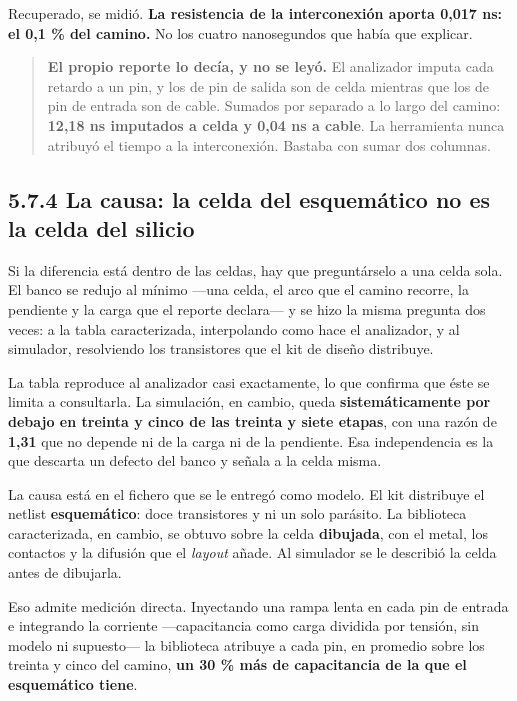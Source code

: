 Recuperado, se midió. \textbf{La resistencia de la interconexión aporta
0,017 ns: el 0,1 \% del camino.} No los cuatro nanosegundos que había
que explicar.

\begin{quote}
\textbf{El propio reporte lo decía, y no se leyó.} El analizador imputa
cada retardo a un pin, y los de pin de salida son de celda mientras que
los de pin de entrada son de cable. Sumados por separado a lo largo del
camino: \textbf{12,18 ns imputados a celda y 0,04 ns a cable}. La
herramienta nunca atribuyó el tiempo a la interconexión. Bastaba con
sumar dos columnas.
\end{quote}

\subsection{5.7.4 La causa: la celda del esquemático no es la celda del
silicio}\label{la-causa-la-celda-del-esquemuxe1tico-no-es-la-celda-del-silicio}

Si la diferencia está dentro de las celdas, hay que preguntárselo a una
celda sola. El banco se redujo al mínimo ---una celda, el arco que el
camino recorre, la pendiente y la carga que el reporte declara--- y se
hizo la misma pregunta dos veces: a la tabla caracterizada, interpolando
como hace el analizador, y al simulador, resolviendo los transistores
que el kit de diseño distribuye.

La tabla reproduce al analizador casi exactamente, lo que confirma que
éste se limita a consultarla. La simulación, en cambio, queda
\textbf{sistemáticamente por debajo en treinta y cinco de las treinta y
siete etapas}, con una razón de \textbf{1,31} que no depende ni de la
carga ni de la pendiente. Esa independencia es la que descarta un
defecto del banco y señala a la celda misma.

La causa está en el fichero que se le entregó como modelo. El kit
distribuye el netlist \textbf{esquemático}: doce transistores y ni un
solo parásito. La biblioteca caracterizada, en cambio, se obtuvo sobre
la celda \textbf{dibujada}, con el metal, los contactos y la difusión
que el \emph{layout} añade. Al simulador se le describió la celda antes
de dibujarla.

Eso admite medición directa. Inyectando una rampa lenta en cada pin de
entrada e integrando la corriente ---capacitancia como carga dividida
por tensión, sin modelo ni supuesto--- la biblioteca atribuye a cada
pin, en promedio sobre los treinta y cinco del camino, \textbf{un 30 \%
más de capacitancia de la que el esquemático tiene}.

